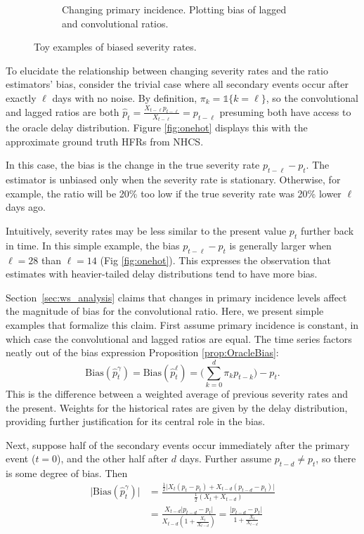\documentclass{article}
\renewcommand{\hat}{\widehat} %
\begin{document}
\begin{figure}
\begin{subfigure}[b]{0.45\linewidth}
         \caption{Changing primary incidence. Plotting bias of lagged and convolutional ratios.}
         \label{fig:chging_primary}
     \end{subfigure}
        \caption{Toy examples of biased severity rates.}
        \label{fig:bias_ex}
\end{figure}


To elucidate the relationship between changing severity rates and the ratio estimators' bias, consider the trivial case where all secondary events occur after exactly $\ell$ days with no noise. By definition, $\pi_k = \mathds{1}\{k=\ell\}$, so the convolutional and lagged ratios are both $\hat{p}_t = \frac{X_{t-\ell}p_{t-\ell}}{X_{t-\ell}} = p_{t-\ell}$ presuming both have access to the oracle delay distribution. Figure \ref{fig:onehot} displays this with the approximate ground truth HFRs from NHCS. 

In this case, the bias is the change in the true severity rate $p_{t-\ell} - p_t$. The estimator is unbiased only when the severity rate is stationary. Otherwise, for example, the ratio will be 20\% too low if the true severity rate was 20\% lower $\ell$ days ago. 

Intuitively, severity rates may be less similar to the present value $p_t$ further back in time. In this simple example, the bias $p_{t-\ell}-p_t$ is generally larger when $\ell=28$ than $\ell=14$ (Fig \ref{fig:onehot}). This expresses the observation that estimates with heavier-tailed delay distributions tend to have more bias. 

Section~\ref{sec:ws_analysis} claims that changes in primary incidence levels affect the magnitude of bias for the convolutional ratio. Here, we present simple examples that formalize this claim. First assume primary incidence is constant, in which case the convolutional and lagged ratios are equal. The time series factors neatly out of the bias expression  Proposition \ref{prop:OracleBias}:
$$\text{Bias}(\hat{p}_t^{\gamma}) = \text{Bias}(\hat{p}_t^\ell) = \Big(\sum_{k=0}^d \pi_k p_{t-k}\Big)-p_t.$$
\noindent This is the difference between a weighted average of previous severity rates and the present. Weights for the historical rates are given by the delay distribution, providing further justification for its central role in the bias. 

Next, suppose half of the secondary events occur immediately after the primary event ($t=0$), and the other half after $d$ days. Further assume $p_{t-d}\neq p_t$, so there is some degree of bias. Then
\begin{align*}
    \lvert\text{Bias}(\hat{p}_t^{\gamma})\rvert &= \frac{\frac{1}{2}\big\lvert X_{t}(p_t-p_t) + X_{t-d}(p_{t-d}-p_t)\big\rvert}{\frac{1}{2}(X_{t}+X_{t-d})} \\
    &=\frac{X_{t-d}\lvert p_{t-d}-p_t\rvert}{X_{t-d}(1+\frac{X_{t}}{X_{t-d}})} = \frac{\lvert p_{t-d}-p_t \rvert}{1+\frac{X_{t}}{X_{t-d}}}
\end{align*}
\end{document}

